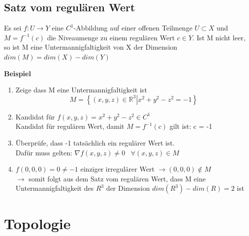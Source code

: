 \documentclass[8pt, a4paper, landscape, fleqn]{scrartcl}
\newenvironment {example}
				{\begin{itshape} \begin{small}}
				{\end{small} \end{itshape}}
\begin{document}
\begin{multicols*}{3}
			\subsection{Satz vom regulären Wert}
			\label{sec:untermannigfaltigkeit}
			    Es sei $f: U \to Y$ eine $C^1$-Abbildung auf einer offenen Teilmenge $U \subset X$ und $M=f^{-1}(c)$ die Niveaumenge zu einem regulären Wert $c \in Y$. Ist M nicht leer, so ist M eine Untermannigfaltigkeit von X der Dimension $dim(M) = dim(X) - dim (Y)$\\
				\begin{example}
					\textbf{Beispiel}
					\begin{enumerate}
					    \item Zeige dass M eine Untermannigfaltigkeit ist \[M=\left\{(x, y, z)\in \mathbb{R}^3 \left \vert  x^2+y^2-z^2 = -1 \right. \right\}\]
					    \item Kandidat für $f(x,y,z)=x^2+y^2-z^2 \in C^1$\\
					    Kandidat für  regulären Wert, damit $M=f^{-1}(c)$ gilt ist: c = -1
					    \item Überprüfe, dass -1 tatsächlich ein regulärer Wert ist.\\ 
					    Dafür muss gelten: $\nabla f(x,y,z)\neq 0 \hspace{10pt} \forall (x,y,z)\in M$
					    \item $f(0,0,0) = 0 \neq -1$ einziger irregulärer Wert $\to (0,0,0) \notin M$\\
					    $\to$ somit folgt aus dem Satz vom regulären Wert, dass M eine Untermannigfaltigkeit des $R^3$ der Dimension $dim(R^3) - dim(R) = 2$ ist
					\end{enumerate}
				\end{example}
		\section{Topologie}

\end{multicols*}
\end{document}
